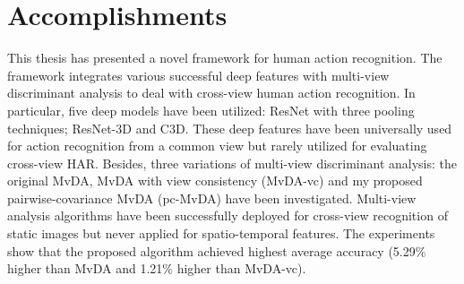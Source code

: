 
\section{Accomplishments}
    This thesis has presented a novel framework for human action recognition.
    The framework integrates various successful deep features with multi-view discriminant analysis to deal with cross-view human action recognition.
    In particular, five deep models have been utilized: ResNet with three pooling techniques; ResNet-3D and C3D.
    These deep features have been universally used for action recognition from a common view but rarely utilized for evaluating cross-view HAR.
    Besides, three variations of multi-view discriminant analysis: the original MvDA, MvDA with view consistency (MvDA-vc) and my proposed pairwise-covariance MvDA (pc-MvDA) have been investigated.
    Multi-view analysis algorithms have been successfully deployed for cross-view recognition of static images but never applied for spatio-temporal features.
    The experiments show that the proposed algorithm achieved highest average accuracy (5.29\% higher than MvDA and 1.21\% higher than MvDA-vc).
